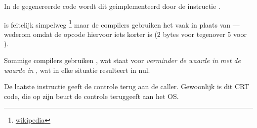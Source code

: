 In de gegenereerde code wordt dit geimplementeerd door de instructie .


\XOR is feitelijk simpelweg \footnote{\href{http://go.yurichev.com/17118}{wikipedia}} maar de compilers gebruiken het vaak in plaats van
 --- wederom omdat de opcode hiervoor iets korter is (2 bytes voor \XOR tegenover 5 voor \MOV).

Sommige compilers gebruiken , wat staat voor \emph{verminder de waarde in} \EAX \emph{met de waarde in} \EAX, wat in elke situatie resulteert in nul.

De laatste instructie \RET geeft de controle terug aan de \gls{caller}. Gewoonlijk is dit \CCpp \ac{CRT} code, die op zijn beurt de controle teruggeeft aan het \ac{OS}.

